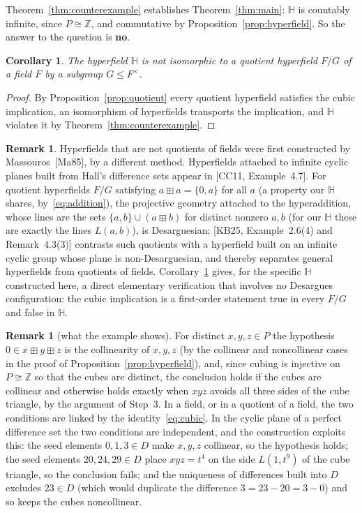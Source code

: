 \documentclass[11pt]{article}
\theoremstyle{plain}
\newtheorem{corollary}[theorem]{Corollary}
\theoremstyle{definition}
\newtheorem{remark}[theorem]{Remark}
\newcommand{\Z}{\mathbb{Z}}
\newcommand{\Hh}{\mathbb{H}}
\newcommand{\bp}{\boxplus}
\begin{document}
Theorem~\ref{thm:counterexample} establishes Theorem~\ref{thm:main}:
$\Hh$ is countably infinite, since $P\cong\Z$, and commutative by
Proposition~\ref{prop:hyperfield}.  So the answer to the question is
\textbf{no}.

\begin{corollary}\label{cor:nonquotient}
The hyperfield $\Hh$ is not isomorphic to a quotient hyperfield $F/G$
of a field $F$ by a subgroup $G\leq F^\times$.
\end{corollary}
\begin{proof}
By Proposition~\ref{prop:quotient} every quotient hyperfield satisfies
the cubic implication, an isomorphism of hyperfields transports the
implication, and $\Hh$ violates it by Theorem~\ref{thm:counterexample}.
\end{proof}

\begin{remark}\label{rem:context}
Hyperfields that are not quotients of fields were first constructed by
Massouros~[Ma85], by a different method.  Hyperfields attached to
infinite cyclic planes built from Hall's difference sets appear in
[CC11, Example~4.7].  For quotient hyperfields $F/G$ satisfying
$a\bp a=\{0,a\}$ for all $a$ (a property our $\Hh$ shares,
by~\eqref{eq:addition}), the projective geometry attached to the
hyperaddition, whose lines are the sets $\{a,b\}\cup(a\bp b)$ for
distinct nonzero $a,b$ (for our $\Hh$ these are exactly the lines
$L(a,b)$), is Desarguesian; [KB25, Example~2.6(4) and Remark~4.3(3)]
contrasts such quotients with a hyperfield built on an infinite cyclic
group whose plane is non-Desarguesian, and thereby separates general
hyperfields from quotients of fields.
Corollary~\ref{cor:nonquotient} gives, for the specific $\Hh$
constructed here, a direct elementary verification that involves no
Desargues configuration: the cubic implication is a first-order
statement true in every $F/G$ and false in $\Hh$.
\end{remark}

\begin{remark}[what the example shows]
For distinct $x,y,z\in P$ the hypothesis $0\in x\bp y\bp z$ is the
collinearity of $x,y,z$ (by the collinear and noncollinear cases in the
proof of Proposition~\ref{prop:hyperfield}), and, since cubing is
injective on $P\cong\Z$ so that the cubes are distinct, the conclusion
holds if the cubes are collinear and otherwise holds exactly when $xyz$
avoids all three sides of the cube triangle, by the argument of
Step~3.  In a field,
or in a quotient of a field, the two conditions are linked by the
identity~\eqref{eq:cubic}.  In the cyclic plane of a perfect difference
set the two conditions are independent, and the construction exploits
this: the seed elements $0,1,3\in D$ make $x,y,z$ collinear, so the
hypothesis holds; the seed elements $20,24,29\in D$ place $xyz=t^4$ on
the side $L(1,t^9)$ of the cube triangle, so the conclusion fails; and
the uniqueness of differences built into $D$ excludes $23\in D$ (which
would duplicate the difference $3=23-20=3-0$) and so keeps the cubes
noncollinear.
\end{remark}
\end{document}
